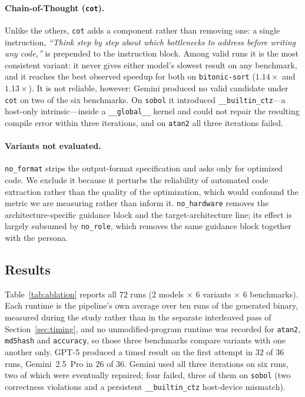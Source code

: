 \paragraph{Chain-of-Thought (\texttt{cot}).}
Unlike the others, \texttt{cot} adds a component rather than removing one: a single instruction,
\textit{``Think step by step about which bottlenecks to address before writing any code,''} is
prepended to the instruction block.
Among valid runs it is the most consistent variant: it never gives either model's slowest result on any
benchmark, and it reaches the best observed speedup for both on \texttt{bitonic-sort}
($1.14\times$ and $1.13\times$). It is not reliable, however: Gemini produced no valid candidate under
\texttt{cot} on two of the six benchmarks. On \texttt{sobol} it introduced
\texttt{\_\_builtin\_ctz}---a host-only intrinsic---inside a \texttt{\_\_global\_\_} kernel and could
not repair the resulting compile error within three iterations, and on \texttt{atan2} all three
iterations failed.

\paragraph{Variants not evaluated.}
\texttt{no\_format} strips the output-format specification and asks only for optimized code. We exclude
it because it perturbs the reliability of automated code extraction rather than the quality of the
optimization, which would confound the metric we are measuring rather than inform it.
\texttt{no\_hardware} removes the architecture-specific guidance block and the target-architecture line;
its effect is largely subsumed by \texttt{no\_role}, which removes the same guidance block together with
the persona.

\subsection{Results}
\label{sec:results}
Table~\ref{tab:ablation} reports all $72$ runs ($2$ models $\times$ $6$ variants $\times$ $6$
benchmarks). Each runtime is the pipeline's own average over ten runs of the generated binary,
measured during the study rather than in the separate interleaved pass of
Section~\ref{sec:timing}, and no unmodified-program runtime was recorded for \texttt{atan2},
\texttt{md5hash} and \texttt{accuracy}, so those three benchmarks compare variants with one another
only. GPT-5 produced a timed result on the first attempt in $32$ of $36$ runs, Gemini~2.5~Pro in
$26$ of $36$. Gemini used all three iterations on six runs, two of which were eventually repaired;
four failed, three of them on \texttt{sobol} (two correctness violations and a persistent
\texttt{\_\_builtin\_ctz} host-device mismatch).

